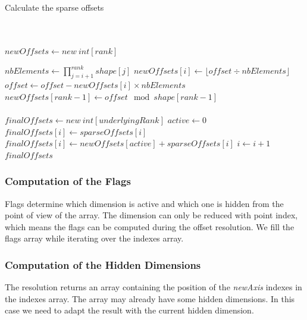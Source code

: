 \begin{algorithm}
	\caption{Calculate the sparse offsets}
	\label{alg:sparseOffsets}
\begin{algorithmic}
	\Statex
	\\
	\\
	\State $newOffsets\gets new\ int[rank]$ 
	
	\State $nbElements \gets \prod_{j=i+1}^{rank} shape[j]$
	\State $newOffsets[i] \gets \lfloor offset \div nbElements\rfloor$
	\State $offset \gets offset - newOffsets[i] \times nbElements$
	\EndFor
	\State $newOffsets[rank-1] \gets offset \mod shape[rank-1]$ 
	\\
	\\	
	\State $finalOffsets\gets new\ int[underlyingRank]$	
	\State $active\gets 0$
	\State $finalOffsets[i] \gets sparseOffsets[i]$
	\Else
	\State $finalOffsets[i] \gets newOffsets[active] + sparseOffsets[i]$
	\State $i \gets i + 1$
	\EndIf
	\EndFor\\
	\Return $finalOffsets$
\EndProcedure
\end{algorithmic}
\end{algorithm}
	

\subsubsection{Computation of the Flags}
Flags determine which dimension is active and which one is hidden from the point of view of the array. The dimension can only be reduced with point index, which means the flags can be computed during the offset resolution. We fill the flags array while iterating over the indexes array.

\subsubsection{Computation of the Hidden Dimensions}

The resolution returns an array containing the position of the \textit{newAxis} indexes in the indexes array. The array may already have some hidden dimensions. In this case we need to adapt the result with the current hidden dimension.

